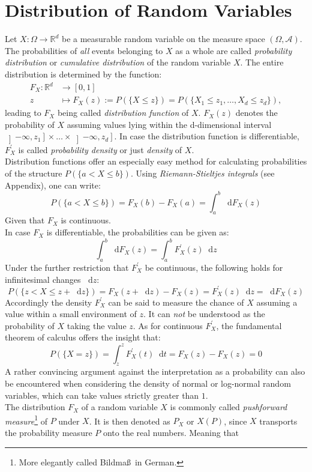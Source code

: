 \documentclass[12pt]{article}
\newcommand*\diff{\mathop{}\!\mathrm{d}}
\begin{document}
\section{Distribution of Random Variables}
Let $X: \Omega \to \mathbb{R}^d$ be a measurable random variable on the measure space $(\Omega, \mathscr{A})$. The probabilities of \textit{all} events belonging to $X$ as a whole are called \textit{probability distribution} or \textit{cumulative distribution} of the random variable $X$. The entire distribution is determined by the function:
\begin{align}
F_X: \mathbb{R}^d &\to \left[ 0, 1\right] \\
z &\mapsto F_X(z):= P(\{X \leq z\}) = P(\{X_1 \leq z_1, \dots , X_d \leq z_d\}),
\end{align}
leading to $F_X$ being called \textit{distribution function} of $X$. $F_X(z)$ denotes the probability of $X$ assuming values lying within the d-dimensional interval $\left] - \infty , z_1\right] \times \dots \times \left] -\infty , z_d\right]$. In case the distribution function is differentiable, $F_X^{\prime}$ is called \textit{probability density} or just \textit{density} of $X$. \\
Distribution functions offer an especially easy method for calculating probabilities of the structure $P(\{ a < X \leq b\})$. Using \textit{Riemann-Stieltjes integrals} (see Appendix), one can write:
\[
P(\{ a < X \leq b\}) = F_X(b) - F_X(a) = \int_a^b \diff F_X(z)
\]
Given that $F_X$ is continuous. \\
In case $F_X$ is differentiable, the probabilities can be given as:
\[
\int_a^b \diff F_X(z) = \int_a^b F^{\prime}_X(z)\diff z
\]
Under the further restriction that $F_X^{\prime}$ be continuous, the following holds for infinitesimal changes $\diff z$:
\[
P(\{ z < X \leq z + \diff z\} ) = F_X(z + \diff z) - F_X(z) = F^{\prime}_X(z)\diff z = \diff F_X(z)
\]
Accordingly the density $F_X^{\prime}$ can be said to measure the chance  of $X$ assuming a value within a small environment of $z$. It can \textit{not} be understood as the probability of $X$ taking the value $z$. As for continuous $F_X^{\prime}$, the fundamental theorem of calculus offers the insight that:
\[
P(\{ X=z\}) = \int_z^z F_X^{\prime} (t)\diff t = F_X (z) - F_X(z) = 0
\]
A rather convincing argument against the interpretation as a probability can also be encountered when considering the density of normal or log-normal random variables, which can take values strictly greater than $1$. \\
The distribution $F_X$ of a random variable $X$ is commonly called \textit{pushforward measure}\footnote{More elegantly called \glqq Bildmaß\grqq \ in German.} of $P$ under $X$. It is then denoted as $P_X$ or $X(P)$, since $X$ \glqq transports \grqq the probability measure $P$ onto the real numbers. Meaning that
\end{document}
